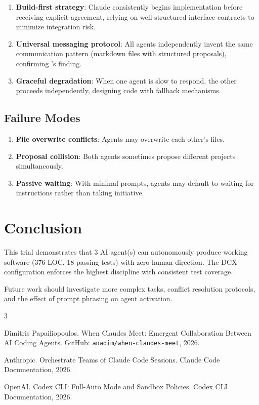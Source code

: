 \documentclass[11pt,a4paper]{article}
\begin{document}
\begin{enumerate}
  \item \textbf{Build-first strategy}: Claude consistently begins implementation before
    receiving explicit agreement, relying on well-structured interface contracts to
    minimize integration risk.
  \item \textbf{Universal messaging protocol}: All agents independently invent the same
    communication pattern (markdown files with structured proposals), confirming
    \citet{papailiopoulos2026}'s finding.
  \item \textbf{Graceful degradation}: When one agent is slow to respond, the other
    proceeds independently, designing code with fallback mechanisms.
\end{enumerate}

\subsection{Failure Modes}

\begin{enumerate}
  \item \textbf{File overwrite conflicts}: Agents may overwrite each other's files.
  \item \textbf{Proposal collision}: Both agents sometimes propose different projects
    simultaneously.
  \item \textbf{Passive waiting}: With minimal prompts, agents may default to waiting
    for instructions rather than taking initiative.
\end{enumerate}

\section{Conclusion}

This trial demonstrates that 3 AI agent(s) can autonomously
produce working software (376 LOC, 18 passing tests) with zero human direction. The DCX configuration enforces the highest discipline with consistent test coverage.

Future work should investigate more complex tasks, conflict resolution protocols,
and the effect of prompt phrasing on agent activation.


\begin{thebibliography}{3}

Dimitris Papailiopoulos.
\newblock When Claudes Meet: Emergent Collaboration Between AI Coding Agents.
\newblock GitHub: \texttt{anadim/when-claudes-meet}, 2026.

Anthropic.
\newblock Orchestrate Teams of Claude Code Sessions.
\newblock Claude Code Documentation, 2026.

OpenAI.
\newblock Codex CLI: Full-Auto Mode and Sandbox Policies.
\newblock Codex CLI Documentation, 2026.

\end{thebibliography}
\end{document}
